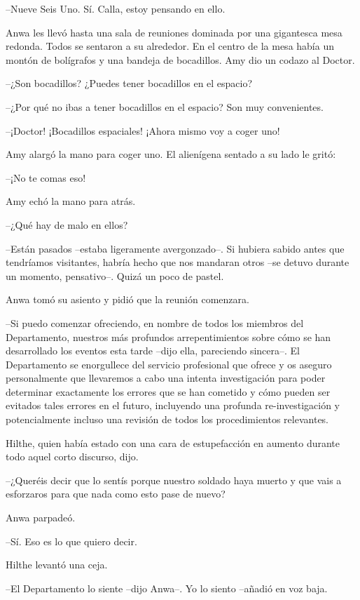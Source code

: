 {--Nueve Seis Uno. Sí. Calla, estoy pensando en ello.}

{Anwa les llevó hasta una sala de reuniones dominada por una gigantesca
	mesa redonda. Todos se sentaron a su alrededor. En el centro de la mesa
	había un montón de bolígrafos y una bandeja de bocadillos. Amy dio un
codazo al Doctor.}

{--¿Son bocadillos? ¿Puedes tener bocadillos en el espacio?}

{--¿Por qué no ibas a tener bocadillos en el espacio? Son muy
convenientes.}

{--¡Doctor! ¡Bocadillos espaciales! ¡Ahora mismo voy a coger uno!}

{Amy alargó la mano para coger uno. El alienígena sentado a su lado le
gritó:}

{--¡No te comas eso!}

{Amy echó la mano para atrás.}

{--¿Qué hay de malo en ellos?}

{--Están pasados --estaba ligeramente avergonzado--. Si hubiera sabido
	antes que tendríamos visitantes, habría hecho que nos mandaran otros
--se detuvo durante un momento, pensativo--. Quizá un poco de pastel.}

{Anwa tomó su asiento y pidió que la reunión comenzara.}

{--Si puedo comenzar ofreciendo, en nombre de todos los miembros del
	Departamento, nuestros más profundos arrepentimientos sobre cómo se han
	desarrollado los eventos esta tarde --dijo ella, pareciendo sincera--.
	El Departamento se enorgullece del servicio profesional que ofrece y os
	aseguro personalmente que llevaremos a cabo una intenta investigación
	para poder determinar exactamente los errores que se han cometido y cómo
	pueden ser evitados tales errores en el futuro, incluyendo una profunda
	re-investigación y potencialmente incluso una revisión de todos los
procedimientos relevantes.}

{Hilthe, quien había estado con una cara de estupefacción en aumento
durante todo aquel corto discurso, dijo.}

{--¿Queréis decir que lo sentís porque nuestro soldado haya muerto y
que vais a esforzaros para que nada como esto pase de nuevo?}

{Anwa parpadeó.}

{--Sí. Eso es lo que quiero decir.}

{Hilthe levantó una ceja.}

{--El Departamento lo siente --dijo Anwa--. Yo lo siento --añadió en
voz baja.}

